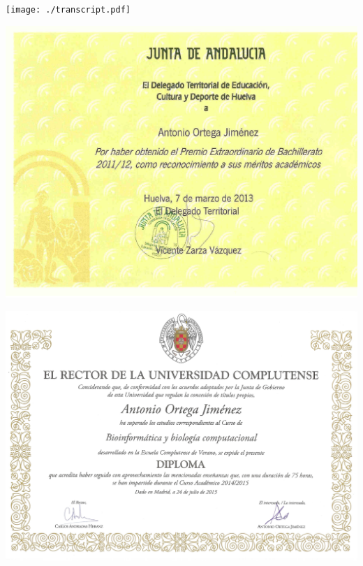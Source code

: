 %



\hypertarget{KU_transcript}{}
\centering
\texttt{[image: ./transcript.pdf]}
\clearpage



\hypertarget{premio_extraordinario}{}
\begin{landscape}
\centering
\includegraphics[scale=0.9]{./premio_extraordinario.pdf}
\end{landscape}
\restoregeometry
\clearpage


\thispagestyle{empty}

\hypertarget{complu}{}
\begin{landscape}
\centering
\includegraphics[scale=0.2]{./bioinformatica2.jpg}
\end{landscape}
\restoregeometry
\clearpage


